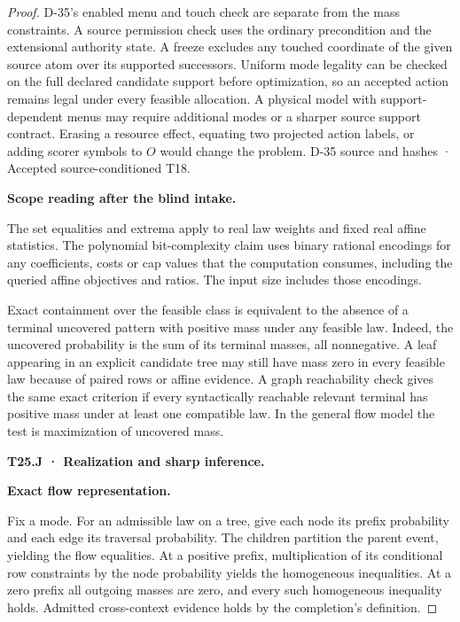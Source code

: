 \begin{proof}
D-35's enabled menu and touch check are separate from the mass constraints. A source permission check uses the ordinary precondition and the extensional authority state. A freeze excludes any touched coordinate of the given source atom over its supported successors. Uniform mode legality can be checked on the full declared candidate support before optimization, so an accepted action remains legal under every feasible allocation. A physical model with support-dependent menus may require additional modes or a sharper source support contract. Erasing a resource effect, equating two projected action labels, or adding scorer symbols to \(O\) would change the problem. D-35 source and hashes · Accepted source-conditioned T18.

\textbf{Scope reading after the blind intake.}

The set equalities and extrema apply to real law weights and fixed real affine statistics. The polynomial bit-complexity claim uses binary rational encodings for any coefficients, costs or cap values that the computation consumes, including the queried affine objectives and ratios. The input size includes those encodings.

Exact containment over the feasible class is equivalent to the absence of a terminal uncovered pattern with positive mass under any feasible law. Indeed, the uncovered probability is the sum of its terminal masses, all nonnegative. A leaf appearing in an explicit candidate tree may still have mass zero in every feasible law because of paired rows or affine evidence. A graph reachability check gives the same exact criterion if every syntactically reachable relevant terminal has positive mass under at least one compatible law. In the general flow model the test is maximization of uncovered mass.

\textbf{T25.J · Realization and sharp inference.}

\textbf{Exact flow representation.}

Fix a mode. For an admissible law on a tree, give each node its prefix probability and each edge its traversal probability. The children partition the parent event, yielding the flow equalities. At a positive prefix, multiplication of its conditional row constraints by the node probability yields the homogeneous inequalities. At a zero prefix all outgoing masses are zero, and every such homogeneous inequality holds. Admitted cross-context evidence holds by the completion's definition.


\end{proof}
